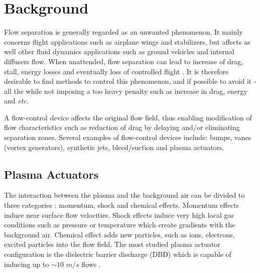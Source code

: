 \documentclass[10pt,a4paper]{article}
\begin{document}


\section{Background}
Flow separation is generally regarded as an unwanted phenomenon. It mainly concerns flight applications such as airplane wings and stabilizers, but affects as well other fluid dynamics applications such as ground vehicles and internal diffusers flow. When unattended, flow separation can lead to increase of drag, stall, energy losses and eventually loss of controlled flight \cite{SIMPSON}. It is therefore desirable to find methods to control this phenomenon, and if possible to avoid it - all the while not imposing a too heavy penalty such as increase in drag, energy and \textit{etc.}  
\par A flow-control device affects the original flow field, thus enabling modification of flow characteristics such as reduction of drag by delaying and/or eliminating separation zones. Several examples of flow-control devices include: bumps, vanes (vortex generators), synthetic jets, bleed/suction and plasma actuators.
\subsection{Plasma Actuators}
The interaction between the plasma and the background air can be divided to three categories \cite{FLOWCTRL}: momentum, shock and chemical effects. Momentum effects induce near surface flow velocities. Shock effects induce very high local gas conditions such as pressure or temperature which create gradients with the background air. Chemical effect adds new particles, such as ions, electrons, excited particles into the flow field. The most studied plasma actuator configuration is the dielectric barrier discharge (DBD) which is capable of inducing up to $\sim10$ $m/s$ flows \cite{FLOWCTRL,KOK,WHALLEY,MOREAU}.
\end{document}
